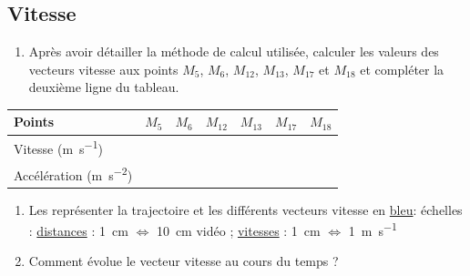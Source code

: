 \documentclass[a4paper,11pt,fleqn]{article}%
\begin{document}
	\subsection*{Vitesse}
	\begin{enumerate}[resume]
	\item Après avoir détailler la méthode de calcul utilisée, calculer les valeurs des vecteurs vitesse aux points $M_5$, $M_6$, $M_{12}$, $M_{13}$, $M_{17}$  et $M_{18}$ et compléter la deuxième ligne du tableau.
	\end{enumerate}
	\noindent {}
	
	\begin{center} \begin{tabular}{|>{\centering}m{2cm}|>{\centering}m{2cm}|>{\centering}m{2cm}|>{\centering}m{2cm}|>{\centering}m{2cm}|>{\centering}m{2cm}|>{\centering\arraybackslash}m{2cm}|} \hline
	Points &  $M_5$& $M_6$& $M_{12}$& $M_{13}$ & $M_{17}$ & $M_{18}$\\ \hline
	Vitesse (\unit{\meter\per\second})& & & & & & \\ \hline
	Accélération  (\unit{\meter\per\second\squared})& & & & & & \\ \hline
	\end{tabular}
	\end{center}
	
	\begin{enumerate}[resume]
	\item Les représenter la trajectoire et les différents vecteurs vitesse en \underline{bleu}: échelles : \underline{distances} : \SI{1}{cm} $\Leftrightarrow$ \SI{10}{cm} vidéo ; \underline{vitesses} :  \SI{1}{cm} $\Leftrightarrow$ \SI{1}{\meter\per\second}
	\item Comment évolue le vecteur vitesse au cours du temps ?
	\end{enumerate}
	\noindent {}
\end{document}
